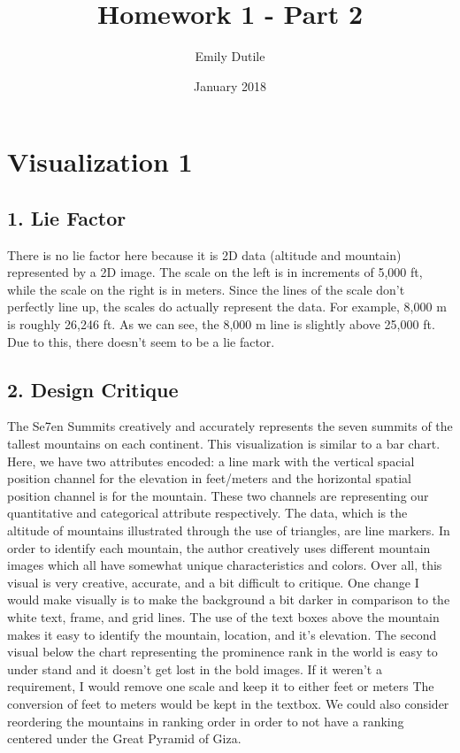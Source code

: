 \documentclass{neu_handout}
\title{Homework 1 - Part 2}
\author{Emily Dutile}
\date{January 2018}
\begin{document}
\section*{Visualization 1}

\subsection*{1. Lie Factor}

There is no lie factor here because it is 2D data (altitude and mountain) represented by a 2D image. The scale on the left is in increments of 5,000 ft, while the scale on the right is in meters. Since the lines of the scale don't perfectly line up, the scales do actually represent the data. For example, 8,000 m is roughly 26,246 ft. As we can see, the 8,000 m line is slightly above 25,000 ft. Due to this, there doesn't seem to be a lie factor.


\subsection*{2. Design Critique}

The Se7en Summits creatively and accurately represents the seven summits of the tallest mountains on each continent. This visualization is similar to a bar chart. Here, we have two attributes encoded: a line mark with the vertical spacial position channel for the elevation in feet/meters and the horizontal spatial position channel is for the mountain. These two channels are representing our quantitative and categorical attribute respectively. The data, which is the altitude of mountains illustrated through the use of triangles, are line markers. In order to identify each mountain, the author creatively  uses different mountain images which all have somewhat unique characteristics and colors. Over all, this visual is very creative, accurate, and a bit difficult to critique. One change I would make visually is to make the background a bit darker in comparison to the white text, frame, and grid lines. The use of the text boxes above the mountain makes it easy to identify the mountain, location, and it's elevation. The second visual below the chart representing the prominence rank in the world is easy to under stand and it doesn't get lost in the bold images. If it weren't a requirement, I would remove one scale and keep it to either feet or meters The conversion of feet to meters would be kept in the textbox. We could also consider reordering the mountains in ranking order in order to not have a ranking centered under the Great Pyramid of Giza.
\end{document}
